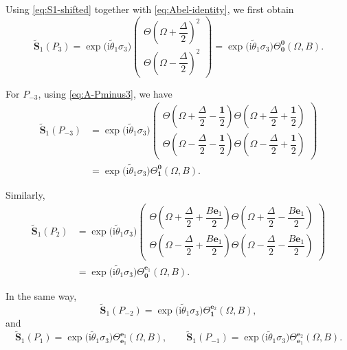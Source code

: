 \documentclass{amsart}
\numberwithin{equation}{hw}
\begin{document}
Using \eqref{eq:S1-shifted} together with \eqref{eq:Abel-identity}, we first obtain
\begin{equation}
\widetilde{\bm{S}}_1(P_3)
=
\exp\!\bigl(
\mathrm{i}\widetilde{\theta}_1\sigma_3
\bigr)
\begin{pmatrix}
\Theta\!\left(
\Omega+\dfrac{\Delta}{2}
\right)^2
\\[10pt]
\Theta\!\left(
\Omega-\dfrac{\Delta}{2}
\right)^2
\end{pmatrix}
=
\exp\!\bigl(
\mathrm{i}\widetilde{\theta}_1\sigma_3
\bigr)
\Theta_{\bm{0}}^{\bm{0}}(\Omega,B).
\label{eq:S1-P3}
\end{equation}

For \(P_{-3}\), using \eqref{eq:A-Pminus3}, we have
\begin{align}
\widetilde{\bm{S}}_1(P_{-3})
&=
\exp\!\bigl(
\mathrm{i}\widetilde{\theta}_1\sigma_3
\bigr)
\begin{pmatrix}
\Theta\!\left(
\Omega+\dfrac{\Delta}{2}-\dfrac{\bm{1}}{2}
\right)
\Theta\!\left(
\Omega+\dfrac{\Delta}{2}+\dfrac{\bm{1}}{2}
\right)
\\[12pt]
\Theta\!\left(
\Omega-\dfrac{\Delta}{2}-\dfrac{\bm{1}}{2}
\right)
\Theta\!\left(
\Omega-\dfrac{\Delta}{2}+\dfrac{\bm{1}}{2}
\right)
\end{pmatrix}
\nonumber\\[4pt]
&=
\exp\!\bigl(
\mathrm{i}\widetilde{\theta}_1\sigma_3
\bigr)
\Theta_{\bm{1}}^{\bm{0}}(\Omega,B).
\label{eq:S1-Pminus3}
\end{align}

Similarly,
\begin{align}
\widetilde{\bm{S}}_1(P_2)
&=
\exp\!\bigl(
\mathrm{i}\widetilde{\theta}_1\sigma_3
\bigr)
\begin{pmatrix}
\Theta\!\left(
\Omega+\dfrac{\Delta}{2}+\dfrac{B\bm{e}_1}{2}
\right)
\Theta\!\left(
\Omega+\dfrac{\Delta}{2}-\dfrac{B\bm{e}_1}{2}
\right)
\\[12pt]
\Theta\!\left(
\Omega-\dfrac{\Delta}{2}+\dfrac{B\bm{e}_1}{2}
\right)
\Theta\!\left(
\Omega-\dfrac{\Delta}{2}-\dfrac{B\bm{e}_1}{2}
\right)
\end{pmatrix}
\nonumber\\[4pt]
&=
\exp\!\bigl(
\mathrm{i}\widetilde{\theta}_1\sigma_3
\bigr)
\Theta_{\bm{0}}^{\bm{e}_1}(\Omega,B).
\label{eq:S1-P2}
\end{align}

In the same way,
\begin{equation}
\widetilde{\bm{S}}_1(P_{-2})
=
\exp\!\bigl(
\mathrm{i}\widetilde{\theta}_1\sigma_3
\bigr)
\Theta_{\bm{1}}^{\bm{e}_2}(\Omega,B),
\label{eq:S1-Pminus2}
\end{equation}
and
\begin{equation}
\widetilde{\bm{S}}_1(P_1)
=
\exp\!\bigl(
\mathrm{i}\widetilde{\theta}_1\sigma_3
\bigr)
\Theta_{\bm{e}_1}^{\bm{e}_1}(\Omega,B),
\qquad
\widetilde{\bm{S}}_1(P_{-1})
=
\exp\!\bigl(
\mathrm{i}\widetilde{\theta}_1\sigma_3
\bigr)
\Theta_{\bm{e}_1}^{\bm{e}_2}(\Omega,B).
\label{eq:S1-P1}
\end{equation}
\end{document}
